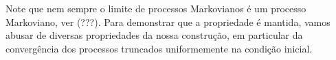 Note que nem sempre o limite de processos Markovianos é um processo
Markoviano, ver (???). Para demonstrar que a propriedade é mantida,
vamos abusar de diversas propriedades da nossa construção, em
particular da convergência dos processos truncados uniformemente na
condição inicial.




